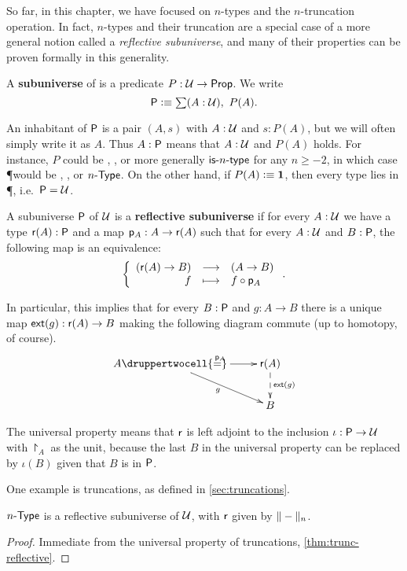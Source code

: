 So far, in this chapter, we have focused on $n$-types and the $n$-truncation operation.
In fact, $n$-types and their truncation are a special case of a more general notion called a \emph{reflective subuniverse}, and many of
their properties can be proven formally in this generality.

\begin{defn}
  A \textbf{subuniverse} of \type is a predicate $P:\type \to \prop$.
  We write
  \[\P \defeq \sm{A:\type} P(A).\]
\end{defn}

An inhabitant of $\P$ is a pair $(A,s)$ with $A:\type$ and $s:P(A)$, but we will often simply write it as $A$.
Thus $A:\P$ means that $A:\type$ and $P(A)$ holds.
For instance, $P$ could be \isprop, \isset, or more generally $\istype{n}$ for any $n\ge-2$, in which case \P would be \prop, \set, or
$\typele{n}$.
On the other hand, if $P(A)\defeq \unit$, then every type lies in \P, i.e.\ $\P=\type$.

\begin{defn}
  A subuniverse $\P$ of $\type$ is a \textbf{reflective subuniverse} if
  for every $A:\type$ we have a type $\reflect(A):\P$ and a map
  $\project_A:A\to\reflect(A)$ such that for every $A:\type$ and $B:\P$, the following map is an equivalence:
  \[\function{(\reflect(A)\to{}B)}{(A\to{}B)}{f}{f\circ\project_A}.\]
\end{defn}

In particular, this implies that for every $B:\P$ and $g:A\to{}B$ there is a unique map $\ext(g):\reflect(A)\to{}B$ making the following
diagram commute (up to homotopy, of course).
\[\uppercurveobject{{ }}\lowercurveobject{{ }}\twocellhead{{ }}
\xymatrix{A \ar^{\project_A}[r] \ar_g[rd] \druppertwocell{=} & \reflect(A)
  \ar@{-->}^{\ext(g)}[d] \\
  & B}\]

The universal property means that $\reflect$ is left adjoint to the inclusion
$\iota:\P\to\type$ with $\project_A$ as the unit, because the last $B$ in the
universal property can be replaced by $\iota(B)$ given that $B$ is in $\P$.

One example is truncations, as defined in \autoref{sec:truncations}.
\begin{lem}
  $\typele{n}$ is a reflective subuniverse of $\type$, with $\reflect$
  given by $\trunc{n}{-}$.
\end{lem}
\begin{proof}
  Immediate from the universal property of truncations, \autoref{thm:trunc-reflective}.
\end{proof}

